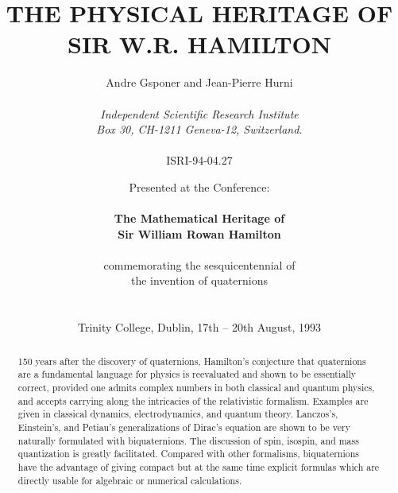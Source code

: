 \documentclass [12pt,a4paper      ]{article}
\begin{document}
\title{\bf\vspace{-2.5cm} THE PHYSICAL HERITAGE OF\\ SIR W.R. HAMILTON}

\author{Andre Gsponer and Jean-Pierre Hurni\\ ~\\ 
\emph{Independent Scientific Research Institute}\\ 
\emph{Box 30, CH-1211 Geneva-12, Switzerland.}\\ 
                 ~\\
            ISRI-94-04.27     }

 
           \date{Presented at the Conference:\\  ~\\
                  {\bf The Mathematical Heritage of \\
                   Sir William Rowan Hamilton}\\ ~\\
              commemorating the sesquicentennial of \\
                 the  invention of quaternions\\ ~\\  ~\\
        Trinity College, Dublin, 17th -- 20th August, 1993}

\maketitle

\begin{abstract}
\noindent
     {\Large 150  years}   after  the  discovery   of   quaternions, 
     Hamilton's    conjecture   that   quaternions   are   a 
     fundamental  language  for  physics is reevaluated  and 
     shown  to be essentially  correct,  provided one admits 
     complex numbers in both  classical and quantum physics, 
     and  accepts  carrying  along the  intricacies  of  the 
     relativistic formalism. Examples are given in classical 
     dynamics,    electrodynamics,   and   quantum   theory.       
     Lanczos's,  Einstein's, and Petiau's generalizations of 
     Dirac's  equation  are  shown  to  be  very   naturally 
     formulated with biquaternions.  The discussion of spin, 
     isospin,  and mass quantization is greatly  facilitated. 
     Compared with other formalisms,  biquaternions have the 
     advantage  of  giving  compact  but at  the  same  time 
     explicit   formulas  which  are  directly  usable   for      
     algebraic or numerical calculations.


\end{abstract}
\end{document}
